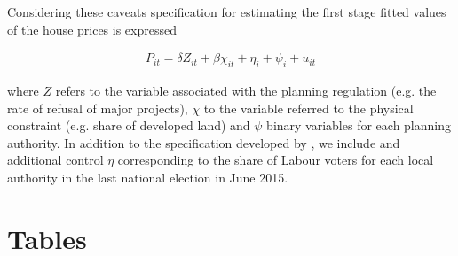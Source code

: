 \documentclass[12pt,letterpaper]{article}
\begin{document}
Considering these caveats specification for estimating the first stage fitted 
values of the house prices is expressed

  \begin{eqnarray}
\label{first stage}
    P_{it} = \delta Z_{it} + \beta \chi_{it} + \eta_{i}+ \psi_{i} + u_{it} 
 \end{eqnarray}

 where $Z$ refers to the variable associated with the planning regulation (e.g. the rate of refusal of major projects), $\chi$  
 to the variable referred to the physical constraint (e.g. share of developed land) and $\psi$ binary variables 
 for each planning authority. In addition to the specification developed by 
\cite{hilber2016supply}, we include and additional control $\eta$ corresponding to the 
share of Labour voters for each local authority in the last national election in June 
2015. 
 
\section{Tables}
\end{document}
